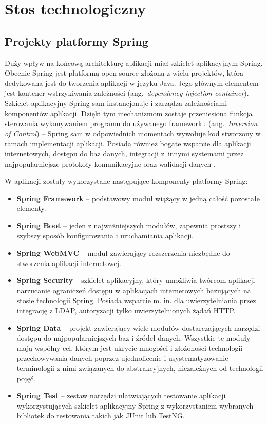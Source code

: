 \section{Stos technologiczny}

\subsection*{Projekty platformy Spring}

Duży wpływ na końcową architekturę aplikacji miał szkielet aplikacyjnym Spring.
Obecnie Spring jest platformą open-source złożoną z wielu projektów, która dedykowana jest do tworzenia aplikacji w języku Java.
Jego głównym elementem jest kontener wstrzykiwania zależności (ang.~\textit{dependency injection container}).
Szkielet aplikacyjny Spring sam instancjonuje i zarządza zależnościami komponentów aplikacji.
Dzięki tym mechanizmom zostaje przeniesiona funkcja sterowania wykonywaniem programu do używanego frameworku (ang.~\textit{Inversion of Control}) -- Spring sam w odpowiednich momentach wywołuje kod stworzony w ramach implementacji aplikacji.
Posiada również bogate wsparcie dla aplikacji internetowych, dostępu do baz danych, integracji z~innymi systemami przez najpopularniejsze protokoły komunikacyjne oraz walidacji danych \cite{SpringReference}.

W aplikacji zostały wykorzystane następujące komponenty platformy Spring:
\begin{itemize}
    \item \textbf{Spring Framework} -- podstawowy moduł wiążący w jedną całość pozostałe elementy.
    \item \textbf{Spring Boot} -- jeden z najważniejszych modułów, zapewnia prostszy i szybszy sposób konfigurowania i uruchamiania aplikacji.
    \item \textbf{Spring WebMVC} -- moduł zawierający rozszerzenia niezbędne do stworzenia aplikacji internetowej.
    \item \textbf{Spring Security} -- szkielet aplikacyjny, który umożliwia twórcom aplikacji narzucanie ograniczeń dostępu w aplikacjach internetowych bazujących na stosie technologii Spring.
    Posiada wsparcie m. in. dla uwierzytelniania przez integrację z LDAP, autoryzacji tylko uwierzytelnionych żądań HTTP.
    \item \textbf{Spring Data} -- projekt zawierający wiele modułów dostarczających narzędzi dostępu do najpopularniejszych baz i źródeł danych. 
    Wszystkie te moduły mają wspólny cel, którym jest ukrycie mnogości i złożoności technologii przechowywania danych poprzez ujednolicenie i usystematyzowanie terminologii z nimi związanych do abstrakcyjnych, niezależnych od technologii pojęć.
    \item \textbf{Spring Test} -- zestaw narzędzi ułatwiających testowanie aplikacji wykorzystujących szkielet aplikacyjny Spring z wykorzystaniem wybranych bibliotek do testowania takich jak JUnit lub TestNG. 
\end{itemize}


